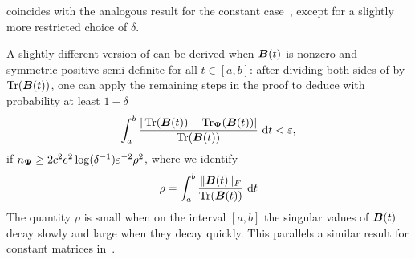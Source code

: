 %

 coincides with the analogous result for the constant case~\cite[Lemma 2.1]{meyer-2021-hutch-optimal}, except for a slightly more restricted choice of $\delta$.

\begin{remark}
    A slightly different version of  can be derived when $\boldsymbol{B}(t)$ is nonzero and symmetric positive semi-definite for all $t \in [a, b]$: after dividing both sides of  by $\operatorname{Tr}(\boldsymbol{B}(t))$, one can apply the remaining steps in the proof to deduce with probability at least $1 - \delta$
    \begin{equation}
        \int_{a}^{b} \frac{| \operatorname{Tr}(\boldsymbol{B}(t)) - \operatorname{Tr}_{\boldsymbol{\Psi}}(\boldsymbol{B}(t)) |}{\operatorname{Tr}(\boldsymbol{B}(t))} ~\mathrm{d}t < \varepsilon,
    \end{equation}
    if $n_{\boldsymbol{\Psi}} \geq 2 c^2 e^2 \log(\delta^{-1}) \varepsilon^{-2} \rho^2$, where we identify
    \begin{equation}
        \rho = \int_{a}^{b} \frac{\lVert \boldsymbol{B}(t) \rVert _F}{\operatorname{Tr}(\boldsymbol{B}(t))} ~\mathrm{d}t
    \end{equation}
    The quantity $\rho$ is small when on the interval $[a, b]$ the singular values of $\boldsymbol{B}(t)$ decay slowly and large when they decay quickly. This parallels a similar result for constant matrices in~\cite[Remark 2]{cortinovis-2022-randomized-trace}.
\end{remark}

\color{blue}

